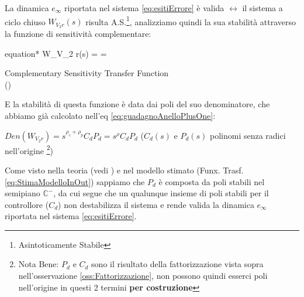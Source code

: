 \newpage
\noindent
La dinamica $ e_\infty $ riportata nel sistema \ref{eq:esitiErrore} è valida $\leftrightarrow$ il sistema a ciclo chiuso $ W_{V_2 r}(s) $ risulta A.S.\footnote{Asintoticamente Stabile}, analizziamo quindi la sua stabilità attraverso la funzione di sensitività complementare:\\
\begin{vwcol}[widths={8cm,8cm}, sep=0mm, rule=0px]
	\vspace{-7.8mm}
	\begin{empheq}[box=\mathStep]{equation*}
		W_{V_2 r}(s) =  = 
	\end{empheq}
	\newpage
	{\small {Complementary Sensitivity Transfer Function}}\\[-6mm]
	{\footnotesize (\cite{PerfAndRobust})}
\end{vwcol}
\noindent
E la stabilità di questa funzione è data dai poli del suo denominatore, che abbiamo già calcolato nell'eq \ref{eq:guadagnoAnelloPlusOne}:

\begin{center}
	{\large $ Den(W_{V_2 r}) = {s^{\rho_{c} + \rho_{p}}} C_d P_d = {s^{\rho}} C_d P_d$} \hspace{8mm} ($ C_d(s) $ e $ P_d(s) $ polinomi  senza radici nell'origine \footnote{Nota Bene: $ P_d $ e $ C_d $ sono il risultato della fattorizzazione vista sopra nell'osservazione \ref{oss:Fattorizzazione}, non possono quindi esserci poli nell'origine in questi 2 termini \textbf{per costruzione}})
\end{center}



Come visto nella teoria (vedi ) e nel modello stimato (Funx. Trasf. \ref{eq:StimaModelloInOut}) sappiamo che $ P_d $ è composta da poli stabili nel semipiano $ \mathbb{C^-} $, da cui segue che un qualunque insieme di poli stabili per il controllore ($ C_d $) non destabilizza il sistema e rende valida la dinamica $ e_\infty $ riportata nel sistema \ref{eq:esitiErrore}.

